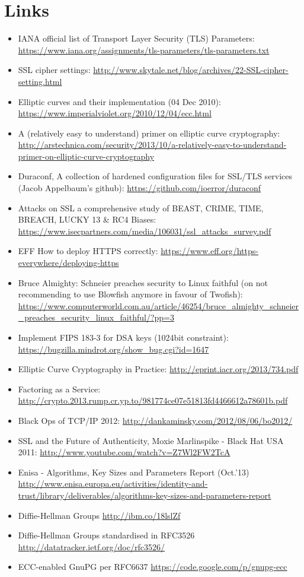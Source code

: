 \section{Links}
\label{section:Links}


\begin{itemize}
\item IANA official list of Transport Layer Security (TLS) Parameters: \url{https://www.iana.org/assignments/tls-parameters/tls-parameters.txt}
\item SSL cipher settings: \url{http://www.skytale.net/blog/archives/22-SSL-cipher-setting.html}
\item Elliptic curves and their implementation (04 Dec 2010): \url{https://www.imperialviolet.org/2010/12/04/ecc.html}
\item A (relatively easy to understand) primer on elliptic curve cryptography: \url{http://arstechnica.com/security/2013/10/a-relatively-easy-to-understand-primer-on-elliptic-curve-cryptography}
\item Duraconf, A collection of hardened configuration files for SSL/TLS services (Jacob Appelbaum's github): \url{https://github.com/ioerror/duraconf}
\item Attacks on SSL a comprehensive study of BEAST, CRIME, TIME, BREACH, LUCKY 13 \& RC4 Biases: \url{https://www.isecpartners.com/media/106031/ssl_attacks_survey.pdf}
\item EFF How to deploy HTTPS correctly: \url{https://www.eff.org/https-everywhere/deploying-https}
\item Bruce Almighty: Schneier preaches security to Linux faithful (on not recommending to use Blowfish anymore in favour of Twofish): \url{https://www.computerworld.com.au/article/46254/bruce_almighty_schneier_preaches_security_linux_faithful/?pp=3}
\item Implement FIPS 183-3 for DSA keys (1024bit constraint): \url{https://bugzilla.mindrot.org/show_bug.cgi?id=1647}
\item Elliptic Curve Cryptography in Practice: \url{http://eprint.iacr.org/2013/734.pdf}
\item Factoring as a Service: \url{http://crypto.2013.rump.cr.yp.to/981774ce07e51813fd4466612a78601b.pdf}
\item Black Ops of TCP/IP 2012: \url{http://dankaminsky.com/2012/08/06/bo2012/}
\item SSL and the Future of Authenticity, Moxie Marlinspike - Black Hat USA 2011: \url{http://www.youtube.com/watch?v=Z7Wl2FW2TcA}
\item Enisa - Algorithms, Key Sizes and Parameters Report (Oct.'13) \url{http://www.enisa.europa.eu/activities/identity-and-trust/library/deliverables/algorithms-key-sizes-and-parameters-report}
\item Diffie-Hellman Groups \url{http://ibm.co/18lslZf}
\item Diffie-Hellman Groups standardised in RFC3526\cite{rfc3526} \url{http://datatracker.ietf.org/doc/rfc3526/}
\item ECC-enabled GnuPG per RFC6637\cite{rfc6637} \url{https://code.google.com/p/gnupg-ecc}
\end{itemize}
